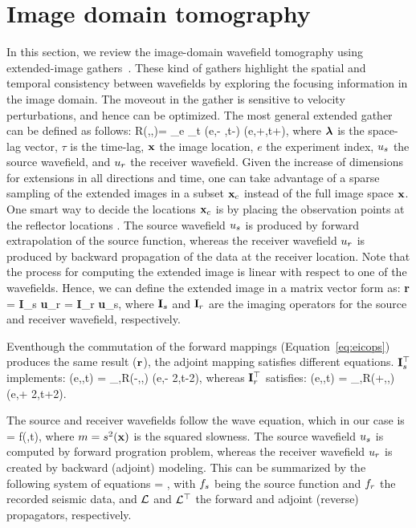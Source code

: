\section{Image domain tomography}

In this section, we review the image-domain wavefield tomography 
 using extended-image gathers~\citep{rickett:883,SavaVasconselos}. These kind of gathers
highlight the spatial and temporal consistency between wavefields by exploring
 the focusing information in the image domain. 
 The moveout in the gather is sensitive to
velocity perturbations, and hence can be optimized. The most
general extended gather can be defined as follows:
\beq
R(\xx,\hh,\tau)= \sum_{{e}} \sum_{t} \US({e},\xx - \hh,t-\tau) \UR({e},\xx+\hh,t+\tau),
\label{eq:eic}
\eeq
 where ${\boldsymbol{\lambda}}$ is the space-lag vector, $\tau$ is the time-lag, ${\bf x}$ the image location, $e$ the
experiment index, $u_s$ the 
 source wavefield, and $u_r$ the receiver wavefield. Given the increase of dimensions 
for extensions in all directions and time, one can take advantage of a sparse sampling 
of the extended images in a subset ${\bf x}_c$ instead of the full image space ${\bf x}$. One smart
way to  decide the locations ${\bf x}_c$ is by placing the observation points at the reflector
locations \citep{cullison}.  
The source wavefield $u_s$
is produced by forward extrapolation of the source function, whereas
the receiver wavefield $u_r$ is produced by backward propagation of the data
at the receiver location. Note that the process for computing the extended
image is linear with respect to one of the wavefields. Hence, we can 
define the extended image in a matrix vector form as: 
\beq
  {\bf r} = {\bf I}_{s} {\bf u}_r = {\bf I}_{r} {\bf u}_s,
\label{eq:eicops}
\eeq
where ${\bf I}_s$ and ${\bf I}_r$ are the imaging operators for the source and receiver wavefield,
respectively. 

Eventhough the commutation of the forward mappings (Equation~\ref{eq:eicops})
 produces the same result ($\bf r$), the adjoint 
mapping satisfies different equations. ${\bf I}_s^\top$ implements:
\beq
  \tilde{\UR}(e,\xx,t) = \sum_{\tau,\hh}R(\xx-\hh,\hh,\tau) \US(e,\xx - 2\hh,t-2\tau),
\eeq
whereas ${\bf I}_r^\top$ satisfies:
\beq
  \tilde{\US}(e,\xx,t) = \sum_{\tau,\hh}R(\xx+\hh,\hh,\tau) \UR(e,\xx + 2\hh,t+2\tau).
\eeq

The source and receiver wavefields follow the wave equation, which in our case
is 
\beq
   = f(\xx,t),
\eeq
where $m=s^2({\bf x})$ is the squared slowness. The source wavefield $u_s$ is computed by forward
progration problem, whereas the receiver wavefield $u_r$ is created by backward (adjoint)
modeling. This can be summarized by the following system of equations
\beq \label{eqn:FSV}
\MAT{ \us \\ \ur} =
\MAT{ \fs \\ \fr} ,
\eeq
with ${f_s}$ being the source function and ${f_r}$ the recorded seismic data, and $\mathcal{L}$ and $\mathcal{L}^\top$ 
the forward and adjoint (reverse) propagators, respectively. 

